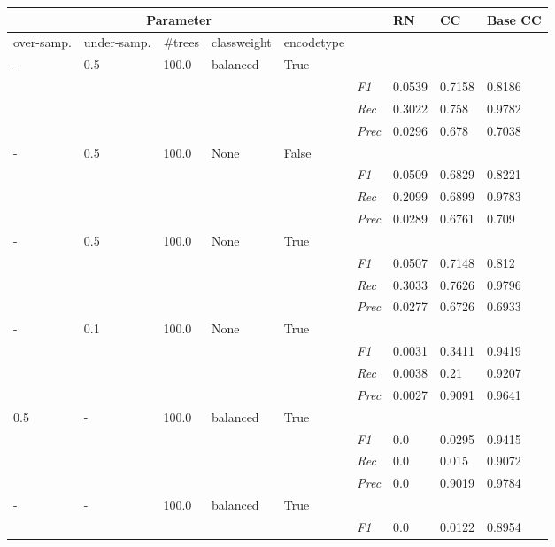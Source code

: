\begin{table}[]
\tiny
\tabcolsep=0.11cm
\begin{tabularx}{\textwidth}{XXXXX|X|X|X|X}
\toprule
\multicolumn{5}{c}{Parameter} & & RN &  CC & Base CC\\ \midrule
over-\newline samp. & under-\newline samp. & \#trees & class\newline weight & encode\newline type  & & & &\\ \midrule
- & 0.5 & 100.0 & balanced & True & & & \\
& & & & & \textit{F1} & 0.0539 & 0.7158    & 0.8186    \\
& & & & & \textit{Rec} &  0.3022 & 0.758 & 0.9782   \\
& & & & & \textit{Prec} & 0.0296 & 0.678 & 0.7038 \\ \midrule
- & 0.5 & 100.0 & None & False & & & \\
& & & & & \textit{F1} & 0.0509 & 0.6829    & 0.8221    \\
& & & & & \textit{Rec} &  0.2099 & 0.6899 & 0.9783   \\
& & & & & \textit{Prec} & 0.0289 & 0.6761 & 0.709 \\ \midrule
- & 0.5 & 100.0 & None & True & & & \\
& & & & & \textit{F1} & 0.0507 & 0.7148    & 0.812    \\
& & & & & \textit{Rec} &  0.3033 & 0.7626 & 0.9796   \\
& & & & & \textit{Prec} & 0.0277 & 0.6726 & 0.6933 \\ \midrule
- & 0.1 & 100.0 & None & True & & & \\
& & & & & \textit{F1} & 0.0031 & 0.3411    & 0.9419    \\
& & & & & \textit{Rec} &  0.0038 & 0.21 & 0.9207   \\
& & & & & \textit{Prec} & 0.0027 & 0.9091 & 0.9641 \\ \midrule
0.5 & - & 100.0 & balanced & True & & & \\
& & & & & \textit{F1} & 0.0 & 0.0295    & 0.9415    \\
& & & & & \textit{Rec} &  0.0 & 0.015 & 0.9072   \\
& & & & & \textit{Prec} & 0.0 & 0.9019 & 0.9784 \\ \midrule
- & - & 100.0 & balanced & True & & & \\
& & & & & \textit{F1} & 0.0 & 0.0122    & 0.8954    \\

\end{tabularx}
\end{table}
